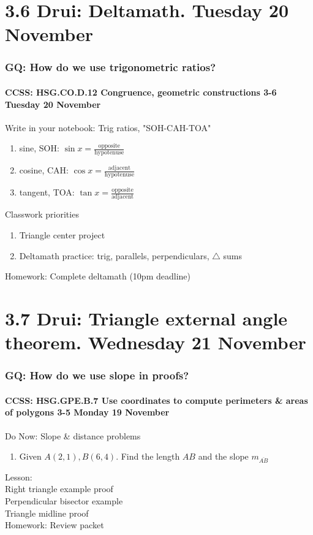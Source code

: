 \documentclass{beamer}
\begin{document}
    \section{3.6 Drui: Deltamath. Tuesday 20 November}
      \frame
      {
        \frametitle{GQ: How do we use trigonometric ratios?}
        \framesubtitle{CCSS: HSG.CO.D.12 Congruence, geometric constructions  \alert{3-6 Tuesday 20 November}}

        \begin{block}{Write in your notebook: Trig ratios, "SOH-CAH-TOA"}
        \begin{enumerate}
            \item sine, SOH: $\displaystyle \sin x = \frac{\text{opposite}} {\text{hypotenuse}}$
            \item cosine, CAH: $\displaystyle \cos x = \frac{\text{adjacent}} {\text{hypotenuse}}$
            \item tangent, TOA: $\displaystyle \tan x = \frac{\text{opposite}} {\text{adjacent}}$
        \end{enumerate}
        \end{block}
        Classwork priorities
        \begin{enumerate}
            \item  Triangle center project
            \item  Deltamath practice: trig, parallels, perpendiculars, $\triangle$ sums
        \end{enumerate}
        Homework: Complete deltamath (10pm deadline)
      }


    \section{3.7 Drui: Triangle external angle theorem. Wednesday 21 November}
      \frame
      {
        \frametitle{GQ: How do we use slope in proofs?}
        \framesubtitle{CCSS: HSG.GPE.B.7 Use coordinates to compute perimeters \& areas of polygons  \alert{3-5 Monday 19 November}}

        \begin{block}{Do Now: Slope \& distance problems}
          \begin{enumerate}
            \item Given $A(2,1),B(6,4)$. Find the length $AB$ and the slope $m_{\overline{AB}}$
          \end{enumerate}
        \end{block}
        Lesson: \\
        Right triangle example proof \\
        Perpendicular bisector example\\
        Triangle midline proof\\[0.5cm]
        Homework: Review packet
      }
\end{document}
